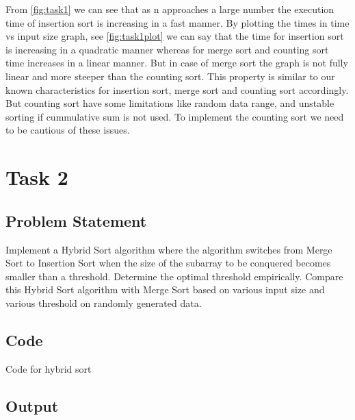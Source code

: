 From \cref{fig:task1} we can see that as n approaches a large number
the execution time of
insertion sort is increasing in a fast manner.
By plotting the times in time vs input size
graph, see \cref{fig:task1plot} we can say that the time for insertion sort is 
increasing in a quadratic manner whereas for merge sort and counting sort 
time increases in a linear manner. But in case of merge sort the graph is not 
fully linear and more steeper than the counting sort. 
This property is similar to our known characteristics for insertion sort, merge sort and counting sort accordingly.
But counting sort have some limitations like random data range, and
unstable sorting if cummulative sum is not used. To implement the counting sort
we need to be cautious of these issues.
\newpage
\section{Task 2}
\subsection{Problem Statement}
Implement a Hybrid Sort algorithm where the algorithm switches from Merge Sort
to Insertion Sort when the size of the subarray to be conquered becomes smaller
than a threshold. Determine the optimal threshold empirically. Compare this
Hybrid Sort algorithm with Merge Sort  based on various input size and various
threshold on randomly generated data.
\subsection{Code}
\begin{code}
    \label{code:hybrid}
    \caption{Code for hybrid sort}
\end{code}
\subsection{Output}

